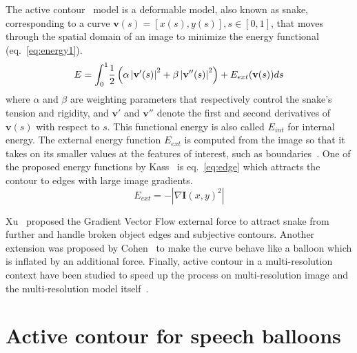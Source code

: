 \documentclass[conference]{IEEEtran}
\begin{document}
The active contour~\cite{Kass1988} model is a deformable model, also known as snake, corresponding to a curve $\mathbf{v}(s)=[x(s),y(s)], s \in [0,1]$, that moves through the spatial domain of an image to minimize the energy functional (eq.~\ref{eq:energy1}).
\begin{equation}\label{eq:energy1}
  E = \int_0^1 \! \frac{1}{2} \left( \alpha \left|\mathbf{v}'(s) \right|^2 + \beta \left| \mathbf{v}''(s) \right|^2 \right) + E_{ext}(\mathbf{v}(s))ds\\
\end{equation}
where $\alpha$ and $\beta$ are weighting parameters that respectively control the snake's tension and rigidity, and $\mathbf{v}'$ and $\mathbf{v}''$ denote the first and second derivatives of $\mathbf{v}(s)$ with respect to $s$. This functional energy is also called $E_{int}$ for internal energy. The external energy function $E_{ext}$ is computed from the image so that it takes on its smaller values at the features of interest, such as boundaries~\cite{Xu1998}.
One of the proposed energy functions by Kass~\cite{Kass1988} is eq.~\ref{eq:edge} which attracts the contour to edges with large image gradients. 
\begin{equation}\label{eq:edge}
  E_{ext} = -|\nabla \mathbf{I}(x,y)^2|
\end{equation}

Xu~\cite{Xu1998} proposed the Gradient Vector Flow external force to attract snake from further and handle broken object edges and subjective contours. %
Another extension was proposed by Cohen~\cite{Cohen1991} to make the curve behave like a balloon which is inflated by an additional force.
Finally, active contour in a multi-resolution context have been studied to speed up the process on multi-resolution image and the multi-resolution model itself~\cite{Leroy1996}.

\section{Active contour for speech balloons}
\label{sec:snake_comics}
\end{document}
